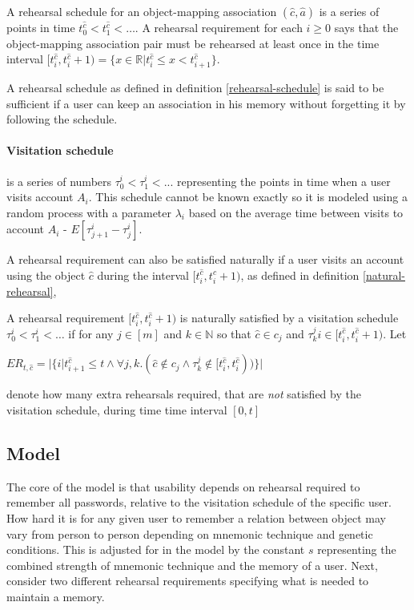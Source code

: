 \begin{definition}\label{rehearsal-schedule}
    \cite{hcp-blocki} A rehearsal schedule for an object-mapping association $(\hat c, \hat a)$ is a series of points in time $t^{\hat c}_0 < t^{\hat c}_1 < \dots$. A rehearsal requirement for each $i \ge 0$ says that the object-mapping association pair must be rehearsed at least once in the time interval $[ t^{\hat c}_i, t^{\hat c}_i+1) = \{x \in \mathbb{R} \vert t^{\hat c}_i \le x < t^{\hat c}_{i+1} \} $.
\end{definition}
A rehearsal schedule as defined in definition \ref{rehearsal-schedule} is said to be sufficient if a user can keep an association in his memory without forgetting it by following the schedule.

\paragraph{Visitation schedule \cite{hcp-blocki}} is a series of numbers $\tau^i_0 < \tau^i_1 < ...$ representing the points in time when a user visits account $A_i$. This schedule cannot be known exactly so it is modeled using a random process with a parameter $\lambda_i$ based on the average time between visits to account $A_i$ - $E[\tau^i_{j+1} - \tau^i_j]$.
\par A rehearsal requirement can also be satisfied naturally if a user visits an account using the object $\hat c$ during the interval $[ t^{\hat c}_i, t^{\hat c}_i+1)$, as defined in definition \ref{natural-rehearsal},

\begin{definition}\label{natural-rehearsal}
    A rehearsal requirement $[ t^{\hat c}_i, t^{\hat c}_i+1)$ is naturally satisfied by a visitation schedule $\tau^i_0 < \tau^i_1 <\dots$ if for any $j \in [m]$ and $k \in \mathbb{N}$ so that $\hat c \in c_j$ and $\tau^j_ki \in [ t^{\hat c}_i, t^{\hat c}_i+1)$. Let \\
    \begin{large}
    \centerline{ $ER_{t,\hat c} = \vert\{ i \vert t^{\hat c}_{i+1} \le t \wedge \forall j ,k.(\hat c \notin c_j \wedge \tau^j_k \notin [t^{\hat c}_i, t^{\hat c}_i))\} \vert$ }
    \end{large}
    denote how many extra rehearsals required, that are \emph{not} satisfied by the visitation schedule, during time time interval $[0,t]$
\end{definition}




\subsection{Model}
The core of the model is that usability depends on rehearsal required to remember all passwords, relative to the visitation schedule of the specific user. How hard it is for any given user to remember a relation between object may vary from person to person depending on mnemonic technique and genetic conditions. This is adjusted for in the model by the constant $s$ representing the combined strength of mnemonic technique and the memory of a user. Next, consider two different rehearsal requirements specifying what is needed to maintain a memory.

